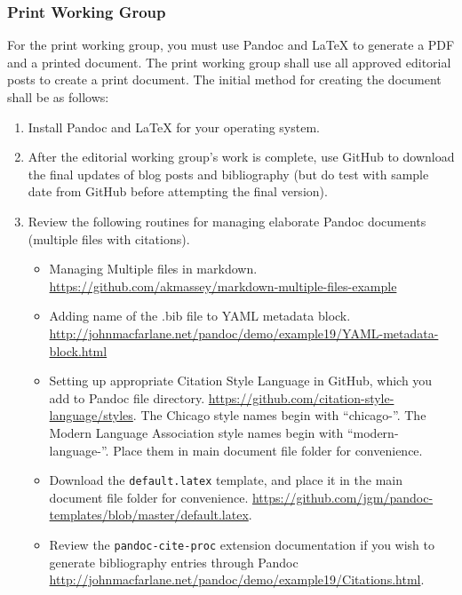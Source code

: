 \documentclass[]{article}
\begin{document}
\subsubsection{Print Working Group}\label{print-working-group}

For the print working group, you must use Pandoc and LaTeX to generate a
PDF and a printed document. The print working group shall use all
approved editorial posts to create a print document. The initial method
for creating the document shall be as follows:

\begin{enumerate}
\def\labelenumi{\arabic{enumi}.}
\item
  Install Pandoc and LaTeX for your operating system.
\item
  After the editorial working group's work is complete, use GitHub to
  download the final updates of blog posts and bibliography (but do test
  with sample date from GitHub before attempting the final version).
\item
  Review the following routines for managing elaborate Pandoc documents
  (multiple files with citations).

  \begin{itemize}
  \itemsep1pt\parskip0pt
  \item
    Managing Multiple files in markdown.
    \url{https://github.com/akmassey/markdown-multiple-files-example}\\
  \item
    Adding name of the .bib file to YAML metadata block.
    \url{http://johnmacfarlane.net/pandoc/demo/example19/YAML-metadata-block.html}
  \item
    Setting up appropriate Citation Style Language in GitHub, which you
    add to Pandoc file directory.
    \url{https://github.com/citation-style-language/styles}. The Chicago
    style names begin with ``chicago-''. The Modern Language Association
    style names begin with ``modern-language-''. Place them in main
    document file folder for convenience.
  \item
    Download the \texttt{default.latex} template, and place it in the
    main document file folder for convenience.
    \url{https://github.com/jgm/pandoc-templates/blob/master/default.latex}.
  \item
    Review the \texttt{pandoc-cite-proc} extension documentation if you
    wish to generate bibliography entries through Pandoc
    \url{http://johnmacfarlane.net/pandoc/demo/example19/Citations.html}.
  \end{itemize}
\end{enumerate}
\end{document}
